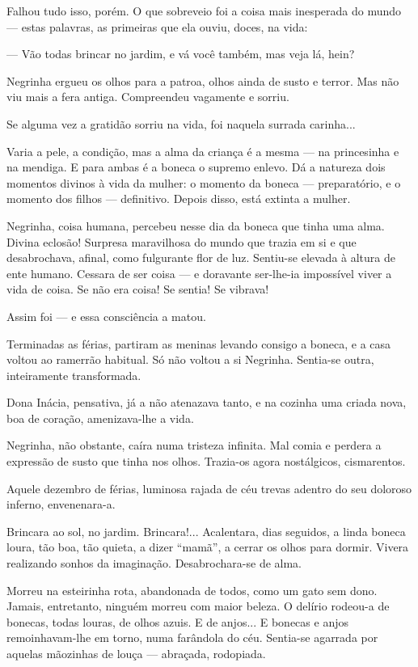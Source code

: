 Falhou tudo isso, porém. O que sobreveio foi a coisa mais inesperada do
mundo --- estas palavras, as primeiras que ela ouviu, doces, na vida:

--- Vão todas brincar no jardim, e vá você também, mas veja lá, hein?

Negrinha ergueu os olhos para a patroa, olhos ainda de susto e terror.
Mas não viu mais a fera antiga. Compreendeu vagamente e sorriu.

Se alguma vez a gratidão sorriu na vida, foi naquela surrada carinha...

Varia a pele, a condição, mas a alma da criança é a mesma --- na
princesinha e na mendiga. E para ambas é a boneca o supremo enlevo. Dá a
natureza dois momentos divinos à vida da mulher: o momento da boneca ---
preparatório, e o momento dos filhos --- definitivo. Depois disso, está
extinta a mulher.

Negrinha, coisa humana, percebeu nesse dia da boneca que tinha uma alma.
Divina eclosão! Surpresa maravilhosa do mundo que trazia em si e que
desabrochava, afinal, como fulgurante flor de luz. Sentiu-se elevada à
altura de ente humano. Cessara de ser coisa --- e doravante ser-lhe-ia
impossível viver a vida de coisa. Se não era coisa! Se sentia! Se
vibrava!

Assim foi --- e essa consciência a matou.

Terminadas as férias, partiram as meninas levando consigo a boneca, e a
casa voltou ao ramerrão habitual. Só não voltou a si Negrinha. Sentia-se
outra, inteiramente transformada.

Dona Inácia, pensativa, já a não atenazava tanto, e na cozinha uma
criada nova, boa de coração, amenizava-lhe a vida.

Negrinha, não obstante, caíra numa tristeza infinita. Mal comia e
perdera a expressão de susto que tinha nos olhos. Trazia-os agora
nostálgicos, cismarentos.

Aquele dezembro de férias, luminosa rajada de céu trevas adentro do seu
doloroso inferno, envenenara-a.

Brincara ao sol, no jardim. Brincara!... Acalentara, dias seguidos, a
linda boneca loura, tão boa, tão quieta, a dizer ``mamã'', a cerrar os
olhos para dormir. Vivera realizando sonhos da imaginação.
Desabrochara-se de alma.

Morreu na esteirinha rota, abandonada de todos, como um gato sem dono.
Jamais, entretanto, ninguém morreu com maior beleza. O delírio rodeou-a
de bonecas, todas louras, de olhos azuis. E de anjos... E bonecas e
anjos remoinhavam-lhe em torno, numa farândola do céu. Sentia-se
agarrada por aquelas mãozinhas de louça --- abraçada, rodopiada.

